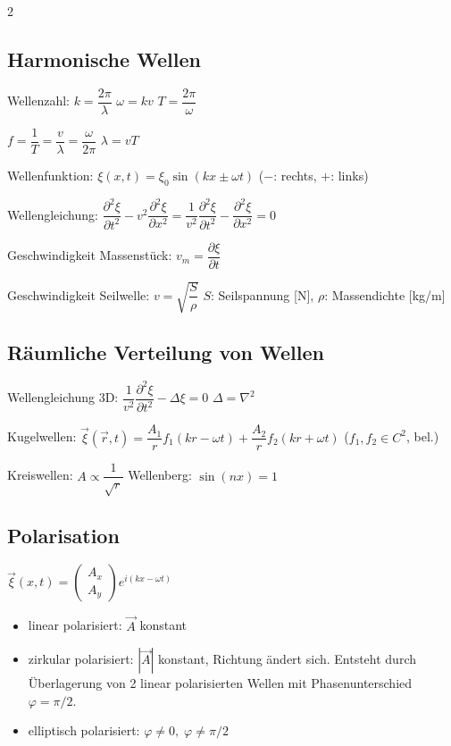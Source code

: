 \documentclass[10pt,a4paper]{article}
\begin{document}
\begin{multicols}{2}
\subsection{Harmonische Wellen}

Wellenzahl: $\boxed{k=\dfrac{2\pi}{\lambda}}$ \quad $\boxed{\omega=kv}$ \quad $\boxed{T=\dfrac{2\pi}{\omega}}$

$\boxed{f=\dfrac{1}{T}=\dfrac{v}{\lambda}=\dfrac{\omega}{2\pi}}$ \quad $\boxed{\lambda=vT}$

Wellenfunktion: $\boxed{\xi(x,t)=\xi_0\sin(kx\pm\omega t)}$ ($-$: rechts, $+$: links)

Wellengleichung:
$\boxed{\dfrac{\partial^2\xi}{\partial t^2}-v^2\dfrac{\partial^2\xi}{\partial x^2}=\dfrac{1}{v^2}\dfrac{\partial^2\xi}{\partial t^2}-\dfrac{\partial^2\xi}{\partial x^2}=0}$

Geschwindigkeit Massenstück: $v_m=\dfrac{\partial\xi}{\partial t}$

Geschwindigkeit Seilwelle: $v=\sqrt{\dfrac{S}{\rho}}$ \quad $S$: Seilspannung [N], $\rho$: Massendichte [kg/m]

\subsection{Räumliche Verteilung von Wellen}

Wellengleichung 3D: $\boxed{\dfrac{1}{v^2}\dfrac{\partial^2\xi}{\partial t^2}-\Delta\xi=0}$ \quad $\Delta=\nabla^2$

Kugelwellen: $\boxed{\vec{\xi}(\vec{r},t)=\dfrac{A_1}{r}f_1(kr-\omega t)+\dfrac{A_2}{r}f_2(kr+\omega t)}$ \quad ($f_1,f_2\in C^2$, bel.)

Kreiswellen: $A\propto\dfrac{1}{\sqrt{r}}$ \quad Wellenberg: $\sin(nx)=1$

\subsection{Polarisation}

$\vec{\xi}(x,t)=\begin{pmatrix}A_x\\A_y\end{pmatrix}e^{i(kx-\omega t)}$

\begin{itemize}
  \item linear polarisiert: $\vec{A}$ konstant
  \item zirkular polarisiert: $|\vec{A}|$ konstant, Richtung ändert sich. Entsteht durch Überlagerung von 2 linear polarisierten Wellen mit Phasenunterschied $\varphi=\pi/2$.
  \item elliptisch polarisiert: $\varphi\neq 0,\;\varphi\neq\pi/2$
\end{itemize}


\end{multicols}
\end{document}
